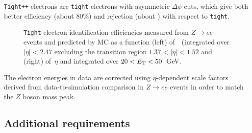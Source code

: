 \texttt{Tight++} electrons are \texttt{tight} electrons with asymmetric $\Delta\phi$ cuts, which give
both better efficiency (about 80\%) and rejection (about ) with respect to \texttt{tight}.

\begin{figure}[tb]\begin{center}
	\caption{\texttt{Tight} electron identification efficiencies measured from $Z\to ee$ events and predicted by MC as a function (left) of~\ET\ (integrated over $|\eta|< 2.47$ excluding the transition region $1.37< |\eta|<1.52$ and (right) of~$\eta$ and integrated over $20< \ET<50$~GeV.~\cite{eperf}\label{fig:eleeff}}
\end{center}\end{figure}

The electron energies in data are corrected using $\eta$-dependent  scale factors derived
from data-to-simulation comparison in $Z\to ee$ events in order to match the $Z$ boson 
mass peak.


\tocless\subsection{Additional requirements}\label{sec:REQtrigger}

